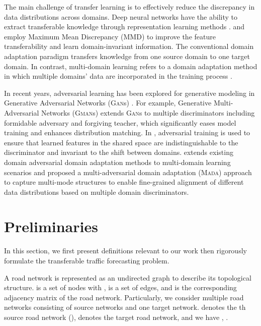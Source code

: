 \documentclass[sigconf]{acmart}
\theoremstyle{definition}
\begin{document}
The main challenge of transfer learning is to effectively reduce the discrepancy in data distributions across domains. Deep neural networks have the ability to extract transferable knowledge through representation learning methods \cite{yosinski2014transferable}. 
\cite{long2015learning} and \cite{long2018transferable} employ Maximum Mean Discrepancy (MMD) to improve the feature transferability and learn domain-invariant information. The conventional domain adaptation paradigm transfers knowledge from one source domain to one target domain. In contrast, multi-domain learning refers to a domain adaptation method in which multiple domains' data are incorporated in the training process \cite{nam2016learning,yang2014unified}. 

In recent years, adversarial learning has been explored for generative modeling in Generative Adversarial Networks (\textsc{Gan}s) \cite{goodfellow2014generative}. For example, Generative Multi-Adversarial Networks (\textsc{Gman}s) \cite{durugkar2016generative} extends \textsc{Gan}s to multiple discriminators including formidable adversary and forgiving teacher, which significantly eases model training and enhances distribution matching. In \cite{ganin2015unsupervised}, adversarial training is used to ensure that learned features in the shared space are indistinguishable to the discriminator and invariant to the shift between domains. \cite{pei2018multi} extends existing domain adversarial domain adaptation methods to multi-domain learning scenarios and proposed a multi-adversarial domain adaptation (\textsc{Mada}) approach to capture multi-mode structures to enable fine-grained alignment of different data distributions based on multiple domain discriminators.

\section{Preliminaries}\label{sec:preliminaries}

In this section, we first present definitions relevant to our work then rigorously formulate the transferable traffic forecasting problem.

\begin{definition}
A road network is represented as an undirected graph  to describe its topological structure.  is a set of nodes with ,  is a set of edges, and  is the corresponding adjacency matrix of the road network. Particularly, we consider multiple road networks consisting of  source networks and one target network.  denotes the th source road network (),  denotes the target road network, and we have , . 
\end{definition}
\end{document}
